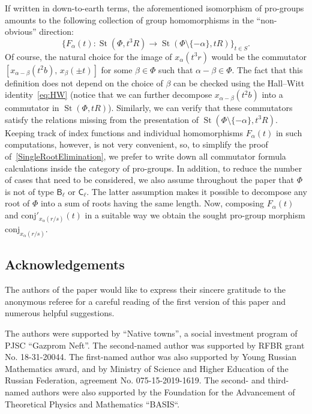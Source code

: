 \documentclass[oneside, 11pt]{amsart}
\numberwithin{equation}{section}
\theoremstyle{definition}
\theoremstyle{remark}
\DeclareMathOperator\St{St}
\newcommand{\rB}{\mathsf{B}}
\newcommand{\rC}{\mathsf{C}}
\begin{document}
If written in down-to-earth terms, the aforementioned isomorphism of pro-groups amounts to the following collection of group homomorphisms in the ``non-obvious'' direction:
\[\{F_\alpha(t)\colon \St(\Phi, t^3R)\rightarrow \St(\Phi\setminus\{-\alpha\}, tR) \}_{t\in S}.\]
Of course, the natural choice for the image of $x_\alpha(t^3r)$ would be the commutator $[x_{\alpha-\beta}(t^2b),\,x_{\beta}(\pm t)]$ for some $\beta \in \Phi$ such that $\alpha-\beta\in \Phi$.
The fact that this definition does not depend on the choice of $\beta$ can be checked using the Hall--Witt identity~\eqref{eq:HW} (notice that we can further decompose $x_{\alpha-\beta}(t^2b)$ into a commutator in $\St(\Phi, tR)$).
Similarly, we can verify that these commutators satisfy the relations missing from the presentation of $\St(\Phi\setminus\{-\alpha\}, t^3R)$. Keeping track of index functions and individual homomorphisms $F_\alpha(t)$ in such computations, however, is not very convenient, so, to simplify the proof of~\cref{SingleRootElimination}, we prefer to write down all commutator formula calculations inside the category of pro-groups. In addition, to reduce the number of cases that need to be considered, we also assume throughout the paper that $\Phi$ is not of type $\rB_\ell$ or $\rC_\ell$. The latter assumption makes it possible to decompose any root of $\Phi$ into a sum of roots having the same length. Now, composing $F_\alpha(t)$ and $\mathrm{conj}'_{x_\alpha(r/s)}(t)$ in a suitable way we obtain the sought pro-group morphism $\mathrm{conj}_{x_\alpha(r/s)}$.

\subsection{Acknowledgements}
The authors of the paper would like to express their sincere gratitude to the anonymous referee for a careful reading of the first version of this paper and numerous helpful suggestions.

The authors were supported by ``Native towns'', a social investment program of PJSC ``Gazprom Neft''.
The second-named author was supported by RFBR grant No. 18-31-20044. 
The first-named author was also supported by Young Russian Mathematics award, and by Ministry of Science and Higher Education of the Russian Federation, agreement No. 075-15-2019-1619.
The second- and third-named authors were also supported by the Foundation for the Advancement of Theoretical Physics and Mathematics ``BASIS``.
\end{document}
